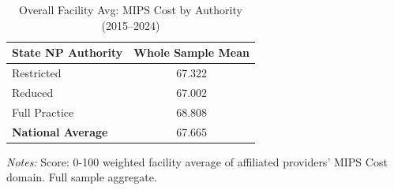\begin{table}[htbp]
    \centering
    \caption{Overall Facility Avg: MIPS Cost by Authority (2015--2024)}
    \label{tab:fac_mips_cost_score_full}
    \vspace{0.2cm}
    \begin{tabular}{lc}
        \toprule
        \textbf{State NP Authority} & \textbf{Whole Sample Mean} \\
        \midrule
        Restricted & 67.322 \\
        Reduced & 67.002 \\
        Full Practice & 68.808 \\
        \midrule
        \textbf{National Average} & 67.665 \\
        \bottomrule
    \end{tabular}
    \vspace{0.1cm}
    \begin{minipage}{0.6\textwidth}
        \footnotesize \textit{Notes:} Score: 0-100 weighted facility average of affiliated providers' MIPS Cost domain. Full sample aggregate.
    \end{minipage}
\end{table}
